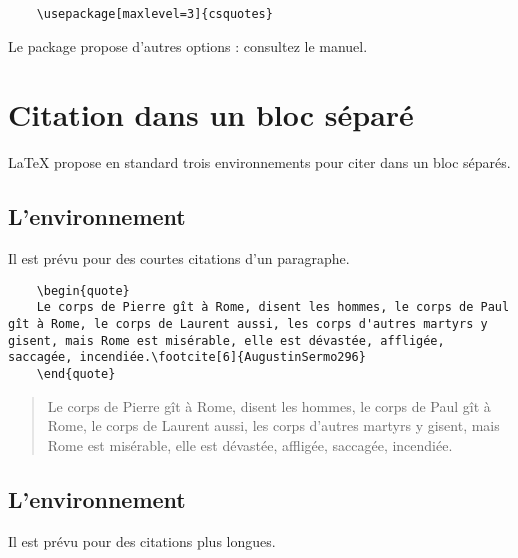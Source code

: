 \begin{verbatim}
	\usepackage[maxlevel=3]{csquotes}
\end{verbatim}

Le package propose d'autres options : consultez le manuel.

\section{Citation dans un bloc séparé}


LaTeX propose en standard trois environnements pour citer dans un bloc séparés.

\subsection{L'environnement }

Il est prévu pour des courtes citations d'un paragraphe.

\begin{verbatim}
	\begin{quote}
	Le corps de Pierre gît à Rome, disent les hommes, le corps de Paul gît à Rome, le corps de Laurent aussi, les corps d'autres martyrs y gisent, mais Rome est misérable, elle est dévastée, affligée, saccagée, incendiée.\footcite[6]{AugustinSermo296}
	\end{quote}
\end{verbatim}


	\begin{quote}
	Le corps de Pierre gît à Rome, disent les hommes, le corps de Paul gît à Rome, le corps de Laurent aussi, les corps d'autres martyrs y gisent, mais Rome est misérable, elle est dévastée, affligée, saccagée, incendiée.
	\end{quote}

\subsection{L'environnement }

Il est prévu pour des citations plus longues.

